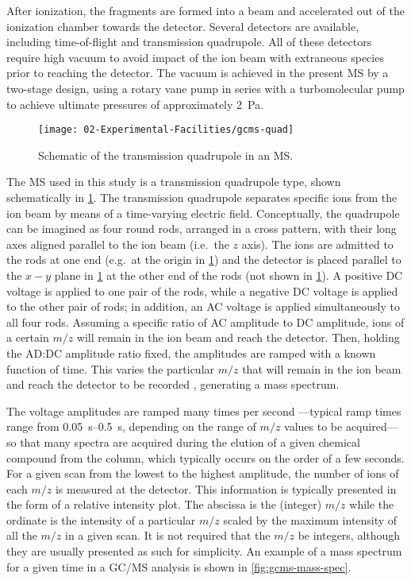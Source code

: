 \documentclass[../main.tex]{subfiles}
\begin{document}
After ionization, the fragments are formed into a beam and accelerated out of the ionization
chamber towards the detector. Several detectors are available, including
time-of-flight and transmission quadrupole. All of these detectors require
high vacuum to avoid impact of the ion beam with extraneous species
prior to reaching the detector. The vacuum is achieved in the present
MS by a two-stage design, using a rotary vane pump in series with a
turbomolecular pump to achieve ultimate pressures of approximately \SI{2}{\pascal}.

\begin{figure}
\texttt{[image: 02-Experimental-Facilities/gcms-quad]}
\caption{Schematic of the transmission quadrupole in an MS.}
\label{fig:gcms-quad}
\end{figure}

The MS used in this study is a transmission quadrupole type, shown
schematically in \cref{fig:gcms-quad}. The transmission quadrupole separates
specific ions from the ion beam by
means of a time-varying electric field. Conceptually, the quadrupole
can be imagined as four round rods, arranged in a cross pattern, with
their long axes aligned parallel to the ion beam (i.e.\ the $z$ axis).
The ions are admitted to the rods at one end (e.g.\ at the origin in
\cref{fig:gcms-quad}) and the detector is placed parallel to the $x-y$ plane
in \cref{fig:gcms-quad} at the other end of the rods (not shown in
\cref{fig:gcms-quad}). A positive DC voltage is applied
to one pair of the rods, while a negative DC voltage is applied to the other
pair of rods; in addition, an AC voltage is applied simultaneously to all four
rods. Assuming a specific ratio of AC amplitude to DC amplitude, ions of a certain
$m/z$ will remain in the ion beam and reach the detector.
Then, holding the AD:DC amplitude ratio fixed, the amplitudes are ramped with a known
function of time. This varies the particular $m/z$ that will remain in the ion beam
and reach the detector to be recorded \cite{Sparkman2011}, generating a mass spectrum.

The voltage amplitudes are ramped many times per second%
---typical ramp times range from \SIrange{0.05}{0.5}{\second},
depending on the range of $m/z$ values to be acquired---so that many
spectra are acquired during the elution of a given chemical compound
from the column, which typically occurs on the order of a few seconds.
For a given scan from the lowest to the highest amplitude, the number of ions
of each $m/z$ is measured at the detector. This information is
typically presented in the form of a relative intensity plot. The abscissa
is the (integer) $m/z$ while the ordinate is the intensity of a particular
$m/z$ scaled by the maximum intensity of all the $m/z$ in a given scan. It
is not required that the $m/z$ be integers, although they are usually presented
as such for simplicity. An example of a mass spectrum for a given time in a
GC/MS analysis is shown in \cref{fig:gcms-mass-spec}.
\end{document}
